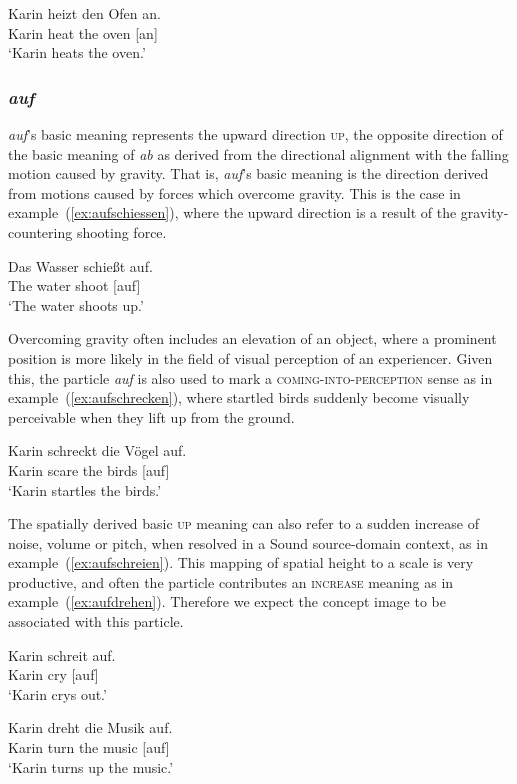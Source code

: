 \documentclass[output=paper]{langsci/langscibook}
\begin{document}
\ea\label{ex:anheizen}
\gll Karin heizt den Ofen an.\\
Karin heat the oven [an]\\
\glt `Karin heats the oven.'
\z

\subsubsection{\textit{auf}}

\textit{auf}'s basic meaning represents the upward direction
\textsc{up}, the opposite direction of the basic meaning of
\textit{ab} as derived from the directional alignment with the falling
motion caused by gravity. That is, \textit{auf}'s basic meaning is the
direction derived from motions caused by forces which overcome
gravity. This is the case in example~(\ref{ex:aufschiessen}), where
the upward direction is a result of the gravity-countering shooting
force.

\ea\label{ex:aufschiessen}
\gll Das Wasser schießt auf.\\
The water shoot [auf]\\
\glt `The water shoots up.'
\z

Overcoming gravity often includes an elevation of an object, where a
prominent position is more likely in the field of visual perception of
an experiencer. Given this, the particle \textit{auf} is also used to
mark a \textsc{coming-into-perception} sense as in
example~(\ref{ex:aufschrecken}), where startled birds suddenly become
visually perceivable when they lift up from the ground.

\ea\label{ex:aufschrecken}
\gll Karin schreckt die Vögel auf.\\
Karin scare the birds [auf]\\
\glt `Karin startles the birds.'
\z

The spatially derived basic \textsc{up} meaning can also refer to a
sudden increase of noise, volume or pitch, when resolved in a
Sound source-domain context, as in
example~(\ref{ex:aufschreien}). This mapping of spatial height to a
scale is very productive, and often the particle contributes an
\textsc{increase} meaning as in
example~(\ref{ex:aufdrehen}). Therefore we expect the concept image
 to be associated with this particle.

\ea\label{ex:aufschreien}
\gll Karin schreit auf.\\
Karin cry [auf]\\
\glt `Karin crys out.'
\z

\ea\label{ex:aufdrehen}
\gll Karin dreht die Musik auf.\\
Karin turn the music [auf]\\
\glt `Karin turns up the music.'
\z
\end{document}
